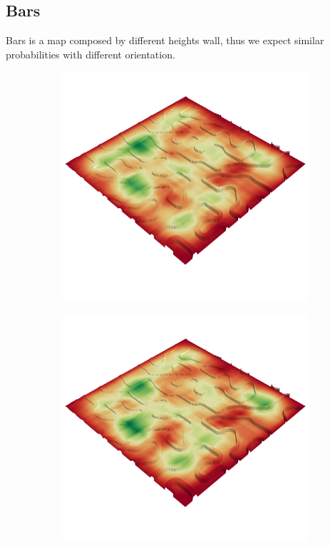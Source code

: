 \documentclass[../document.tex]{subfiles}
\begin{document}
\subsection{Bars}
Bars is a map composed by different heights wall, thus we expect similar probabilities with different orientation.

\begin{figure} [htbp]
  \centering
  \begin{subfigure}[b]{0.45\textwidth}
    \includegraphics[width=\linewidth]{../img/4/traversability/bars/-270.png} 
  \end{subfigure}
  \begin{subfigure}[b]{0.45\textwidth}
      \includegraphics[width=\linewidth]{../img/4/traversability/bars/-90.png}

\end{subfigure}
\end{figure}
\end{document}
